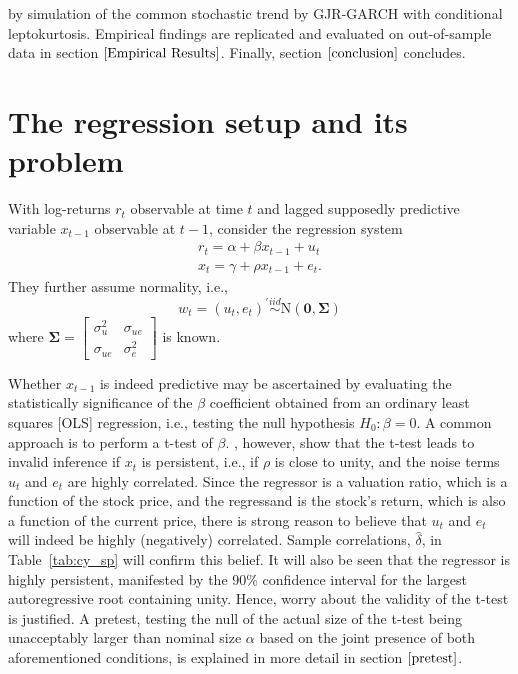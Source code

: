 \documentclass[11pt, a4paper]{article}
\begin{document}
by simulation of the common stochastic trend by GJR-GARCH with conditional leptokurtosis. Empirical findings are replicated and evaluated on out-of-sample data in section $\ref{Empirical Results}$. Finally, section $\ref{conclusion}$ concludes.

\section{The regression setup and its problem}
\label{regression}
With log-returns $r_{t}$ observable at time $t$ and lagged supposedly predictive variable $x_{t-1}$ observable at $t-1$,  \citet{campbell2006efficient} consider the regression system
\begin{align} 
\label{eqn:1}
r_{t} = \alpha + \beta x_{t-1} + u_{t} \\ 
\label{eqn:2}
x_{t} = \gamma + \rho  x_{t-1} + e_{t}.
\end{align}
They further assume normality, i.e., 
\begin{equation}
w_{t}=\left(u_{t}, e_{t}\right)^{\prime} \stackrel{i i d}{\sim} \mathrm{N}(\boldsymbol{0}, \boldsymbol{\Sigma})
\end{equation} where  $\boldsymbol{\Sigma}=\left[\begin{array}{cc}{\sigma_{u}^{2}} & {\sigma_{u e}} \\ {\sigma_{u e}} & {\sigma_{e}^{2}}\end{array}\right]$ is known.


Whether $x_{t-1}$ is indeed predictive may be ascertained by evaluating the statistically significance of the $\beta$ coefficient obtained from an ordinary least squares [OLS] regression, i.e., testing the null hypothesis $H_0: \beta = 0$. A common approach is to perform a t-test of $\beta$. \citet{elliott1994inference}, however, show that the t-test leads to invalid inference if $x_{t}$ is persistent, i.e., if $\rho$ is close to unity, and the noise terms $u_{t}$ and $e_{t}$ are highly correlated. Since the regressor is a valuation ratio, which is a function of the stock price, and the regressand is the stock's return, which is also a function of the current price, there is strong reason to believe that $u_{t}$ and $e_{t}$ will indeed be highly (negatively) correlated. Sample correlations, $\hat{\delta}$, in Table~\vref{tab:cy_sp} will confirm this belief. It will also be seen that the regressor is highly persistent, manifested by the 90\% confidence interval for the largest autoregressive root containing unity. Hence, worry about the validity of the t-test is justified. A pretest, testing the null of the actual size of the t-test being unacceptably larger than nominal size $\alpha$ based on the joint presence of both aforementioned conditions, is explained in more detail in section $\ref{pretest}$.
\end{document}
